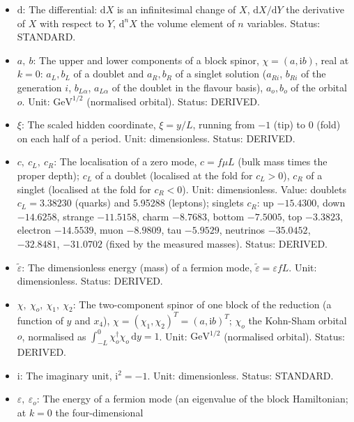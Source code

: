\documentclass[
  10pt,
]{article}
\providecommand{\tightlist}{%
  \setlength{\itemsep}{0pt}\setlength{\parskip}{0pt}}
\begin{document}
\begin{itemize}
\tightlist
\item
  \(\mathrm{d}\): The differential: \(\mathrm{d}X\) is an infinitesimal
  change of \(X\), \(\mathrm{d}X/\mathrm{d}Y\) the derivative of \(X\)
  with respect to \(Y\), \(\mathrm{d}^nX\) the volume element of \(n\)
  variables. Status: STANDARD.
\item
  \(a,\ b\): The upper and lower components of a block spinor,
  \(\chi = (a, \mathrm{i}b)\), real at \(k = 0\): \(a_L, b_L\) of a
  doublet and \(a_R, b_R\) of a singlet solution (\(a_{Ri}\), \(b_{Ri}\)
  of the generation \(i\), \(b_{L\alpha}\), \(a_{L\alpha}\) of the
  doublet in the flavour basis), \(a_o, b_o\) of the orbital \(o\).
  Unit: \(\mathrm{GeV}^{1/2}\) (normalised orbital). Status: DERIVED.
\item
  \(\xi\): The scaled hidden coordinate, \(\xi = y/L\), running from
  \(-1\) (tip) to \(0\) (fold) on each half of a period. Unit:
  dimensionless. Status: DERIVED.
\item
  \(c,\ c_L,\ c_R\): The localisation of a zero mode, \(c = f\mu L\)
  (bulk mass times the proper depth); \(c_L\) of a doublet (localised at
  the fold for \(c_L > 0\)), \(c_R\) of a singlet (localised at the fold
  for \(c_R < 0\)). Unit: dimensionless. Value: doublets
  \(c_L = 3.38230\) (quarks) and 5.95288 (leptons); singlets \(c_R\): up
  \(-15.4300\), down \(-14.6258\), strange \(-11.5158\), charm
  \(-8.7683\), bottom \(-7.5005\), top \(-3.3823\), electron
  \(-14.5539\), muon \(-8.9809\), tau \(-5.9529\), neutrinos
  \(-35.0452\), \(-32.8481\), \(-31.0702\) (fixed by the measured
  masses). Status: DERIVED.
\item
  \(\tilde\varepsilon\): The dimensionless energy (mass) of a fermion
  mode, \(\tilde\varepsilon = \varepsilon fL\). Unit: dimensionless.
  Status: DERIVED.
\item
  \(\chi,\ \chi_o,\ \chi_1,\ \chi_2\): The two-component spinor of one
  block of the reduction (a function of \(y\) and \(x_4\)),
  \(\chi = (\chi_1, \chi_2)^T = (a, \mathrm{i}b)^T\); \(\chi_o\) the
  Kohn-Sham orbital \(o\), normalised as
  \(\int_{-L}^{0}\chi_o^\dagger\chi_o\,\mathrm{d}y = 1\). Unit:
  \(\mathrm{GeV}^{1/2}\) (normalised orbital). Status: DERIVED.
\item
  \(\mathrm{i}\): The imaginary unit, \(\mathrm{i}^2 = -1\). Unit:
  dimensionless. Status: STANDARD.
\item
  \(\varepsilon,\ \varepsilon_o\): The energy of a fermion mode (an
  eigenvalue of the block Hamiltonian; at \(k = 0\) the four-dimensional

\end{itemize}
\end{document}
